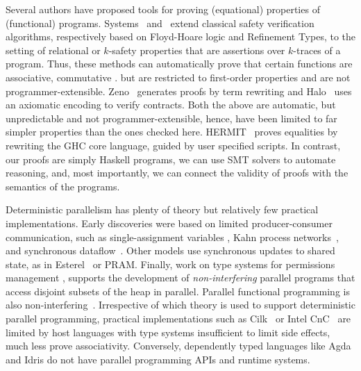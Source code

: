 %
Several authors have proposed tools for proving
(equational) properties of (functional) programs.
%
Systems~\citet{sousa16} and~\citet{KobayashiRelational15}
extend classical safety verification algorithms,
respectively based on Floyd-Hoare logic and Refinement Types,
to the setting of relational or $k$-safety properties
that are assertions over $k$-traces of a program.
%
Thus, these methods can automatically prove that
certain functions are associative, commutative \etc.
but are restricted to first-order properties and
are not programmer-extensible.
%
Zeno~\citep{ZENO} generates proofs by term
rewriting and Halo~\citep{HALO} uses an axiomatic
encoding to verify contracts.
%
Both the above are automatic, but unpredictable and not
programmer-extensible, hence, have been limited to
far simpler properties than the ones checked here.
%
HERMIT~\citep{Farmer15} proves equalities by rewriting
the GHC core language, guided by user specified scripts.
%
In contrast, our proofs are simply Haskell programs,
we can use SMT solvers to automate reasoning, and,
most importantly, we can connect the validity of
proofs with the semantics of the programs.

%
%

%
Deterministic parallelism has plenty of theory but relatively few practical
implementations.  Early discoveries were based on limited producer-consumer
communication, such as single-assignment variables \cite{Tesler-1968,IStructures}, Kahn
process networks~\cite{kahn-1974}, and synchronous dataflow~\cite{lee-sdf}.
Other models use synchronous updates to shared state, as in
Esterel~\cite{synchronous-overview} or PRAM.  Finally, work on type systems for
permissions management \cite{permission-types,habanero-java-permissions},
supports the development of {\em non-interfering} parallel programs that access
disjoint subsets of the heap in parallel.  Parallel functional programming is
also non-interfering~\cite{manticore,multicore-ghc}.
%
Irrespective of which theory is used to support deterministic parallel
programming, practical implementations such as Cilk~\cite{cilk} or Intel
CnC~\cite{cnc} are limited by host languages with type systems insufficient to
limit side effects, much less prove associativity.  Conversely, dependently
typed languages like Agda and Idris do not have parallel programming APIs and
runtime systems.




